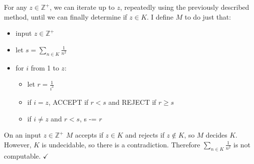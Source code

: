 \documentclass[11pt]{article}
\begin{document}
For any $z \in \mathbb{Z}^+$, we can iterate up to $z$, repeatedly using the previously described method, until we can finally determine if $z \in K$.
I define $M$ to do just that:
\begin{itemize}
	\item input $z \in \mathbb{Z}^+$
	\item let $s = \sum _{n\in K} \frac{1}{n^2}$
	\item for $i$ from 1 to $z$:
	\begin{itemize}
		\item let $r = \frac{1}{i^2}$
		\item if $i = z$, ACCEPT if $r < s$ and REJECT if $r \geq s$
		\item if $i \neq z$ and $r < s$, s -= $r$
	\end{itemize}
\end{itemize}

On an input $z \in \mathbb{Z}^+$ $M$ accepts if $z \in K$ and rejects if $z \notin K$, so $M$ decides $K$.
However, $K$ is undecidable, so there is a contradiction.
Therefore $\sum _{n \in K} \frac{1}{n^2}$ is not computable. $\checkmark$
\end{document}
